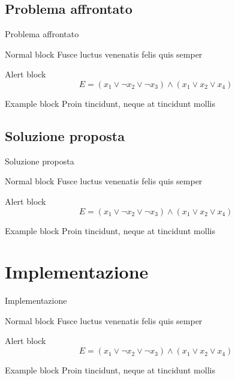 \documentclass{beamer}
\begin{document}
	\subsection{Problema affrontato}

	\begin{frame}{Problema affrontato}
		\begin{block}{Normal block}
			Fusce luctus venenatis felis quis semper
		\end{block}

		\begin{alertblock}{Alert block}
			$$ E = (x_1 \vee \neg x_2 \vee \neg x_3) \wedge (x_1 \vee x_2 \vee x_4) $$
		\end{alertblock}

		\begin{exampleblock}{Example block}
			Proin tincidunt, neque at tincidunt mollis
		\end{exampleblock}
	\end{frame}
	
	\subsection{Soluzione proposta}

	\begin{frame}{Soluzione proposta}
		\begin{block}{Normal block}
			Fusce luctus venenatis felis quis semper
		\end{block}

		\begin{alertblock}{Alert block}
			$$ E = (x_1 \vee \neg x_2 \vee \neg x_3) \wedge (x_1 \vee x_2 \vee x_4) $$
		\end{alertblock}

		\begin{exampleblock}{Example block}
			Proin tincidunt, neque at tincidunt mollis
		\end{exampleblock}
	\end{frame}
	
	\section{Implementazione}

	\begin{frame}{Implementazione}
		\begin{block}{Normal block}
			Fusce luctus venenatis felis quis semper
		\end{block}

		\begin{alertblock}{Alert block}
			$$ E = (x_1 \vee \neg x_2 \vee \neg x_3) \wedge (x_1 \vee x_2 \vee x_4) $$
		\end{alertblock}

		\begin{exampleblock}{Example block}
			Proin tincidunt, neque at tincidunt mollis
		\end{exampleblock}
	\end{frame}
	
\end{document}
